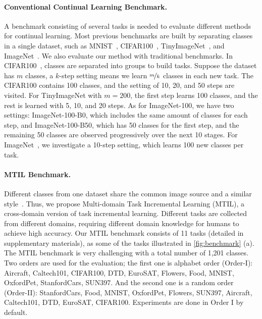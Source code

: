 \paragraph{Conventional Continual Learning Benchmark.} A benchmark consisting of several tasks is needed to evaluate different methods for continual learning. Most previous benchmarks are built by separating classes in a single dataset, such as MNIST~\cite{van2019three}, CIFAR100~\cite{douillard2022dytox}, TinyImageNet~\cite{yan2021dynamically}, and ImageNet~\cite{yan2021dynamically,zhu2021prototype}. We also evaluate our method with traditional benchmarks. In CIFAR100~\cite{Krizhevsky09learningmultiple}, classes are separated into groups to build tasks. Suppose the dataset has $m$ classes, a $k$-step setting means we learn $\nicefrac{m}{k}$ classes in each new task. The CIFAR100 contains 100 classes, and the setting of 10, 20, and 50 steps are visited. For TinyImageNet with $m=200$, the first step learns 100 classes, and the rest is learned with 5, 10, and 20 steps. As for ImageNet-100, we have two settings: ImageNet-100-B0, which includes the same amount of classes for each step, and ImageNet-100-B50, which has 50 classes for the first step, and the remaining 50 classes are observed progressively over the next 10 stages. For ImageNet~\cite{deng2009imagenet}, we investigate a 10-step setting, which learns 100 new classes per task.

\paragraph{MTIL Benchmark.} Different classes from one dataset share the common image source and a similar style~\cite{recht2019imagenet,hendrycks2021many}. Thus, we propose Multi-domain Task Incremental Learning (MTIL), a cross-domain version of task incremental learning. Different tasks are collected from different domains, requiring different domain knowledge for humans to achieve high accuracy. Our MTIL benchmark consists of 11 tasks (detailed in supplementary materials), as some of the tasks illustrated in \cref{fig:benchmark} (a). The MTIL benchmark is very challenging with a total number of 1,201 classes. Two orders are used for the evaluation; the first one is alphabet order (Order-I): Aircraft, Caltech101, CIFAR100, DTD, EuroSAT, Flowers, Food, MNIST, OxfordPet, StanfordCars, SUN397. And the second one is a random order (Order-II): StanfordCars, Food, MNIST, OxfordPet, Flowers, SUN397, Aircraft, Caltech101, DTD, EuroSAT, CIFAR100. Experiments are done in Order I by default.


